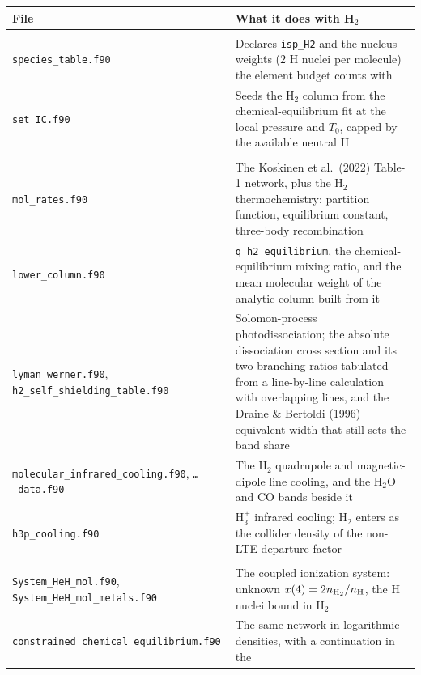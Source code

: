 \documentclass[english,a4paper]{my_memo}
\begin{document}
\begin{table}[htbp]
\centering
\small
\begin{tabular}{@{}>{\raggedright\arraybackslash}p{}>{\raggedright\arraybackslash}p{}@{}}
\toprule
File & What it does with H$_2$ \\
\midrule
\multicolumn{2}{@{}l}{\textbf{\texttt{init/}}} \\
\texttt{species\_table.f90}
  & Declares \texttt{isp\_H2} and the nucleus weights ($2$ H nuclei per
    molecule) the element budget counts with \\
\texttt{set\_IC.f90}
  & Seeds the H$_2$ column from the chemical-equilibrium fit at the local
    pressure and $T_0$, capped by the available neutral H \\
\addlinespace
\multicolumn{2}{@{}l}{\textbf{\texttt{lower\_atmosphere/}}} \\
\texttt{mol\_rates.f90}
  & The Koskinen et al.\ (2022) Table-1 network, plus the H$_2$
    thermochemistry: partition function, equilibrium constant, three-body
    recombination \\
\texttt{lower\_column.f90}
  & \texttt{q\_h2\_equilibrium}, the chemical-equilibrium mixing ratio, and
    the mean molecular weight of the analytic column built from it \\
\texttt{lyman\_werner.f90},
\texttt{h2\_self\_shielding\_\allowbreak table.f90}
  & Solomon-process photodissociation; the absolute dissociation cross
    section and its two branching ratios tabulated from a line-by-line
    calculation with overlapping lines, and the Draine \& Bertoldi (1996)
    equivalent width that still sets the band share \\
\texttt{molecular\_infrared\_\allowbreak cooling.f90},
\texttt{\dots\_data.f90}
  & The H$_2$ quadrupole and magnetic-dipole line cooling, and the H$_2$O and
    CO bands beside it \\
\texttt{h3p\_cooling.f90}
  & H$_3^+$ infrared cooling; H$_2$ enters as the collider density of the
    non-LTE departure factor \\
\addlinespace
\multicolumn{2}{@{}l}{\textbf{\texttt{nonlinear\_system\_solver/}}} \\
\texttt{System\_HeH\_mol.f90},
\texttt{System\_HeH\_mol\_\allowbreak metals.f90}
  & The coupled ionization system: unknown $x(4) = 2n_{\rm H_2}/n_{\rm H}$,
    the H nuclei bound in H$_2$ \\
\texttt{constrained\_chemical\_\allowbreak equilibrium.f90}
  & The same network in logarithmic densities, with a continuation in the

\end{tabular}
\end{table}
\end{document}
